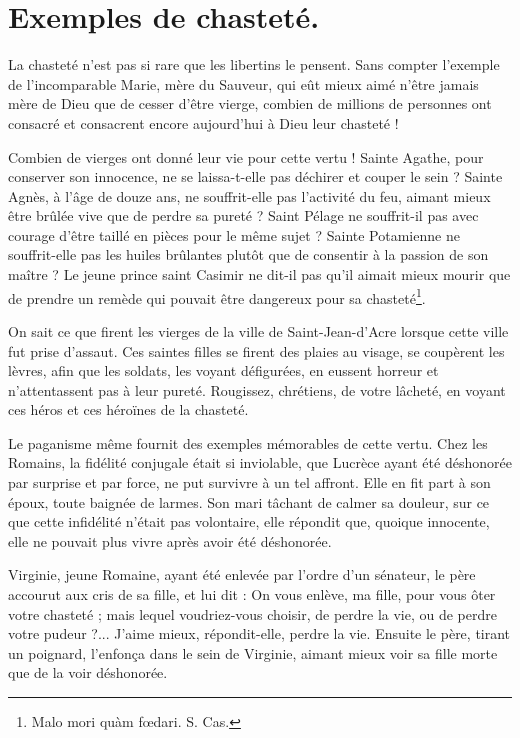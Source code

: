 \documentclass[instructions.tex]{subfiles}
\begin{document}
 
\chapter{Exemples de chasteté.}
 
La chasteté n’est pas si rare que les libertins le pensent. Sans compter l’exemple de l’incomparable Marie, mère du Sauveur, qui eût mieux aimé n’être jamais mère de Dieu que de cesser d’être vierge, combien de millions de personnes ont consacré et consacrent encore aujourd’hui à Dieu leur chasteté !
 
\primo Combien de vierges ont donné leur vie pour cette vertu ! Sainte Agathe, pour conserver son innocence, ne se laissa-t-elle pas déchirer et couper le sein ? Sainte Agnès, à l’âge de douze ans, ne souffrit-elle pas l’activité du feu, aimant mieux être brûlée vive que de perdre sa pureté ? Saint Pélage ne souffrit-il pas avec courage d’être taillé en pièces pour le même sujet ? Sainte Potamienne ne souffrit-elle pas les huiles brûlantes plutôt que de consentir à la passion de son maître ? Le jeune prince saint Casimir ne dit-il pas qu’il aimait mieux mourir que de prendre un remède qui pouvait être dangereux pour sa chasteté\footnote{Malo mori quàm fœdari. S. Cas.}.
 
On sait ce que firent les vierges de la ville de Saint-Jean-d’Acre lorsque cette ville fut prise d’assaut. Ces saintes filles se firent des plaies au visage, se coupèrent les lèvres, afin que les soldats, les voyant défigurées, en eussent horreur et n’attentassent pas à leur pureté. Rougissez, chrétiens, de votre lâcheté, en voyant ces héros et ces héroïnes de la chasteté.
 
\secundo Le paganisme même fournit des exemples mémorables de cette vertu. Chez les Romains, la fidélité conjugale était si inviolable, que Lucrèce ayant été déshonorée par surprise et par force, ne put survivre à un tel affront. Elle en fit part à son époux, toute baignée de larmes. Son mari tâchant de calmer sa douleur, sur ce que cette infidélité n’était pas volontaire, elle répondit que, quoique innocente, elle ne pouvait plus vivre après avoir été déshonorée.
 
Virginie, jeune Romaine, ayant été enlevée par l’ordre d’un sénateur, le père accourut aux cris de sa fille, et lui dit : On vous enlève, ma fille, pour vous ôter votre chasteté ; mais lequel voudriez-vous choisir, de perdre la vie, ou de perdre votre pudeur ?... J’aime mieux, répondit-elle, perdre la vie. Ensuite le père, tirant un poignard, l’enfonça dans le sein de Virginie, aimant mieux voir sa fille morte que de la voir déshonorée.
 
\end{document}
